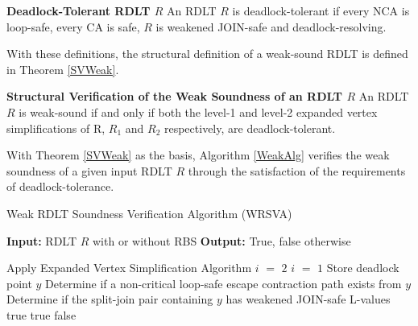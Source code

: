 \begin{defn}\textbf{Deadlock-Tolerant RDLT $ R $}
    An RDLT $ R $ is deadlock-tolerant if every NCA is loop-safe, every CA is safe, $ R $ is weakened JOIN-safe and deadlock-resolving.
\end{defn}

With these definitions, the structural definition of a weak-sound RDLT is defined in Theorem \ref{SVWeak}.

\begin{thm}\textbf{Structural Verification of the Weak Soundness of an RDLT $ R $}
    \label{SVWeak}
    An RDLT $ R $ is weak-sound if and only if both the level-1 and level-2 expanded vertex simplifications of R, $ R_1 $ and $ R_2 $ respectively, are deadlock-tolerant.
\end{thm}

With Theorem \ref{SVWeak} as the basis, Algorithm \ref{WeakAlg} verifies the weak soundness of a given input RDLT $ R $ through the satisfaction of the requirements of deadlock-tolerance.

\begin{algorithm}[H]
    \caption{Weak RDLT Soundness Verification Algorithm (WRSVA) }
    \label{WeakAlg}
    \begin{algorithmic}
        \State \textbf{Input:} RDLT $ R $ with or without RBS
        \State \textbf{Output:} True, false otherwise
    \end{algorithmic}
    \begin{algorithmic}[1]
        \State Apply Expanded Vertex Simplification Algorithm \cite{MalinaoWCTP2023}
            \State $ i $ $ = $ $ 2 $
        \Else
            \State $ i $ $ = $ $ 1 $
        \EndIf
                \State Store deadlock point $ y $
            \EndFor
                \State Determine if a non-critical loop-safe escape contraction path exists from $ y $
                \State Determine if the split-join pair containing $ y $ has weakened JOIN-safe L-values
            \EndFor            
        \EndFor
                    \State \Return true
                \EndIf
            \EndIf
            \State \Return true
        \Else
            \State \Return false
        \EndIf
    \end{algorithmic}
\end{algorithm}

